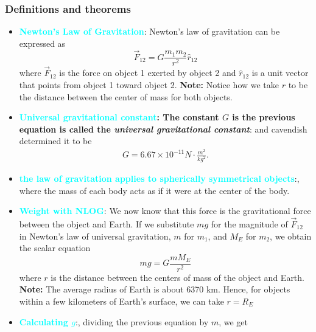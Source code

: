 \documentclass{report}
\begin{document}
    \subsubsection{Definitions and theorems}
    \begin{itemize}
        \item \textbf{\textcolor{cyan}{Newton’s Law of Gravitation}}:
            Newton's law of gravitation can be expressed as
            \begin{equation}
                \vec{F}_{12} = G \frac{m_1 m_2}{r^2} \hat{r}_{12}
            \end{equation}
            where $\vec{F}_{12}$ is the force on object 1 exerted by object 2 and $\hat{r}_{12}$ is a unit vector that points from object 1 toward object 2.
            \bigbreak \noindent 
            \bigbreak \noindent 
            \textbf{Note:} Notice how we take $r$ to be the distance between the center of mass for both objects.
        \item \textbf{\textcolor{cyan}{Universal gravitational constant}: The constant $G$ is the previous equation is called the \textit{universal gravitational constant}}: and cavendish determined it to be 
            \begin{align*}
                G = 6.67 \times 10^{-11} N \cdot \frac{m^{2}}{kg^{2}}
            .\end{align*}
        \item \textbf{\textcolor{cyan}{the law of gravitation applies to spherically symmetrical objects}}:, where the mass of each body acts as if it were at the center of the body.
        \item \textbf{\textcolor{cyan}{Weight with NLOG}}:
            We now know that this force is the gravitational force between the object and Earth. If we substitute $mg$ for the magnitude of $\vec{F}_{12}$ in Newton's law of universal gravitation, $m$ for $m_1$, and $M_E$ for $m_2$, we obtain the scalar equation
            \begin{equation}
                mg = G \frac{m M_E}{r^2}
            \end{equation}
            \bigbreak \noindent 
            where $r$ is the distance between the centers of mass of the object and Earth.
            \bigbreak \noindent 
            \textbf{Note:} The average radius of Earth is about 6370 km. Hence, for objects within a few kilometers of Earth’s surface, we can take $r=R_{E}$
        \item \textbf{\textcolor{cyan}{Calculating $g$}}:, dividing the previous equation by $m$, we get

\end{itemize}
\end{document}
